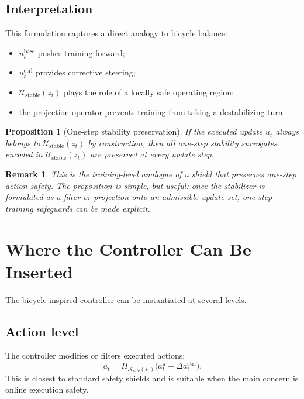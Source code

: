 \documentclass[11pt]{article}
\newtheorem{proposition}{Proposition}
\newtheorem{remark}{Remark}
\begin{document}
\subsection{Interpretation}

This formulation captures a direct analogy to bicycle balance:
\begin{itemize}[leftmargin=1.5em]
    \item $u_t^{\mathrm{base}}$ pushes training forward;
    \item $u_t^{\mathrm{ctrl}}$ provides corrective steering;
    \item $\mathcal U_{\mathrm{stable}}(z_t)$ plays the role of a locally safe operating region;
    \item the projection operator prevents training from taking a destabilizing turn.
\end{itemize}

\begin{proposition}[One-step stability preservation]
If the executed update $u_t$ always belongs to $\mathcal U_{\mathrm{stable}}(z_t)$ by construction, then all one-step stability surrogates encoded in $\mathcal U_{\mathrm{stable}}(z_t)$ are preserved at every update step.
\end{proposition}

\begin{remark}
This is the training-level analogue of a shield that preserves one-step action safety. The proposition is simple, but useful: once the stabilizer is formulated as a filter or projection onto an admissible update set, one-step training safeguards can be made explicit.
\end{remark}

\section{Where the Controller Can Be Inserted}

The bicycle-inspired controller can be instantiated at several levels.

\subsection{Action level}

The controller modifies or filters executed actions:
\begin{equation}
a_t = \Pi_{\mathcal A_{\mathrm{safe}}(s_t)}\bigl(a_t^{\pi} + \Delta a_t^{\mathrm{ctrl}}\bigr).
\end{equation}
This is closest to standard safety shields and is suitable when the main concern is online execution safety.
\end{document}
